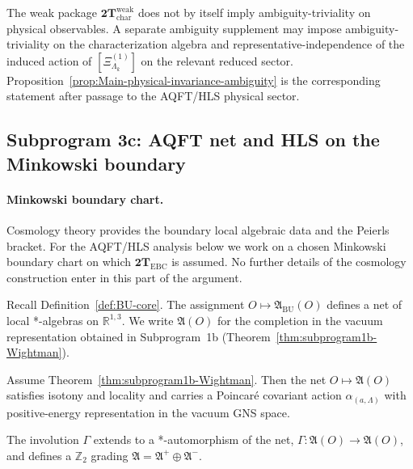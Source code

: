 \begin{remark}
The weak package \(\mathbf{2T}_{\mathrm{char}}^{\mathrm{weak}}\) does not by
itself imply ambiguity-triviality on physical observables. A separate ambiguity
supplement may impose ambiguity-triviality on the characterization algebra and
representative-independence of the induced action of
\([\Xi^{(1)}_{\Lambda_k}]\) on the relevant reduced sector.
Proposition~\ref{prop:Main-physical-invariance-ambiguity} is the corresponding
statement after passage to the AQFT/HLS physical sector.
\end{remark}

\subsection{Subprogram 3c: AQFT net and HLS on the Minkowski boundary}
\label{sec:subprogram3c}

\paragraph{Minkowski boundary chart.}
Cosmology theory provides the boundary local algebraic data and the Peierls
bracket.  For the AQFT/HLS analysis below we work on a chosen Minkowski
boundary chart on which \(\mathbf{2T}_{\mathrm{EBC}}\) is assumed.  No further
details of the cosmology construction enter in this part of the argument.

\begin{definition}
\label{def:BU-net}
Recall Definition~\ref{def:BU-core}. The assignment $O\mapsto\mathfrak A_{\mathrm{BU}}(O)$
defines a net of local *-algebras on $\mathbb R^{1,3}$.  We write $\mathfrak A(O)$ for
the completion in the vacuum representation obtained in Subprogram~1b
(Theorem~\ref{thm:subprogram1b-Wightman}).
\end{definition}

\begin{proposition}
\label{prop:HK}
Assume Theorem~\ref{thm:subprogram1b-Wightman}. Then the net
$O\mapsto\mathfrak A(O)$ satisfies isotony and locality and carries a
Poincar\'e covariant action $\alpha_{(a,\Lambda)}$ with positive-energy
representation in the vacuum GNS space.
\end{proposition}

\begin{lemma}
\label{lem:Gamma-net}
The involution $\Gamma$ extends to a *-automorphism of the net,
$\Gamma:\mathfrak A(O)\to\mathfrak A(O)$, and defines a $\mathbb Z_2$ grading
$\mathfrak A=\mathfrak A^{+}\oplus\mathfrak A^{-}$.
\end{lemma}

